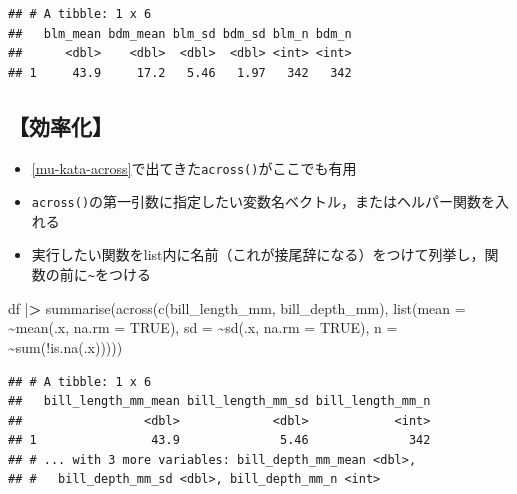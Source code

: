 \documentclass[
  xelatex,ja=standard, b5paper]{bxjsbook}
\newenvironment{Shaded}{\begin{snugshade}}{\end{snugshade}}
\newcommand{\AttributeTok}[1]{\textcolor[rgb]{0.77,0.63,0.00}{#1}}
\newcommand{\ConstantTok}[1]{\textcolor[rgb]{0.00,0.00,0.00}{#1}}
\newcommand{\ErrorTok}[1]{\textcolor[rgb]{0.64,0.00,0.00}{\textbf{#1}}}
\newcommand{\FunctionTok}[1]{\textcolor[rgb]{0.00,0.00,0.00}{#1}}
\newcommand{\NormalTok}[1]{#1}
\newcommand{\SpecialCharTok}[1]{\textcolor[rgb]{0.00,0.00,0.00}{#1}}
\providecommand{\tightlist}{%
  \setlength{\itemsep}{0pt}\setlength{\parskip}{0pt}}
\begin{document}
\begin{verbatim}
## # A tibble: 1 x 6
##   blm_mean bdm_mean blm_sd bdm_sd blm_n bdm_n
##      <dbl>    <dbl>  <dbl>  <dbl> <int> <int>
## 1     43.9     17.2   5.46   1.97   342   342
\end{verbatim}

\hypertarget{su-st-ef}{%
\subsection{【効率化】}\label{su-st-ef}}

\begin{itemize}
\tightlist
\item
  \ref{mu-kata-across}で出てきた\texttt{across()}がここでも有用
\item
  \texttt{across()}の第一引数に指定したい変数名ベクトル，またはヘルパー関数を入れる
\item
  実行したい関数をlist内に名前（これが接尾辞になる）をつけて列挙し，関数の前に\texttt{\textasciitilde{}}をつける
\end{itemize}

\begin{Shaded}
\begin{Highlighting}[]
\NormalTok{df }\SpecialCharTok{|}\ErrorTok{\textgreater{}} 
  \FunctionTok{summarise}\NormalTok{(}\FunctionTok{across}\NormalTok{(}\FunctionTok{c}\NormalTok{(bill\_length\_mm, bill\_depth\_mm),}
                   \FunctionTok{list}\NormalTok{(}\AttributeTok{mean =} \SpecialCharTok{\textasciitilde{}}\FunctionTok{mean}\NormalTok{(.x, }\AttributeTok{na.rm =} \ConstantTok{TRUE}\NormalTok{),}
                        \AttributeTok{sd =} \SpecialCharTok{\textasciitilde{}}\FunctionTok{sd}\NormalTok{(.x, }\AttributeTok{na.rm =} \ConstantTok{TRUE}\NormalTok{),}
                        \AttributeTok{n =} \SpecialCharTok{\textasciitilde{}}\FunctionTok{sum}\NormalTok{(}\SpecialCharTok{!}\FunctionTok{is.na}\NormalTok{(.x)))))}
\end{Highlighting}
\end{Shaded}

\begin{verbatim}
## # A tibble: 1 x 6
##   bill_length_mm_mean bill_length_mm_sd bill_length_mm_n
##                 <dbl>             <dbl>            <int>
## 1                43.9              5.46              342
## # ... with 3 more variables: bill_depth_mm_mean <dbl>,
## #   bill_depth_mm_sd <dbl>, bill_depth_mm_n <int>
\end{verbatim}
\end{document}
